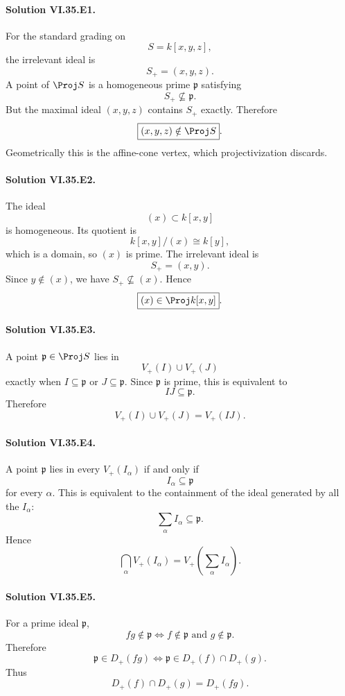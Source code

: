 
\paragraph{Solution VI.35.E1.}
For the standard grading on
\[
S=k[x,y,z],
\]
the irrelevant ideal is
\[
S_+=(x,y,z).
\]
A point of \(\Proj S\) is a homogeneous prime \(\mathfrak p\) satisfying
\[
S_+\not\subseteq\mathfrak p.
\]
But the maximal ideal \((x,y,z)\) contains \(S_+\) exactly. Therefore
\[
\boxed{(x,y,z)\notin\Proj S}.
\]
Geometrically this is the affine-cone vertex, which projectivization discards.

\paragraph{Solution VI.35.E2.}
The ideal
\[
(x)\subset k[x,y]
\]
is homogeneous. Its quotient is
\[
k[x,y]/(x)\cong k[y],
\]
which is a domain, so \((x)\) is prime. The irrelevant ideal is
\[
S_+=(x,y).
\]
Since \(y\notin(x)\), we have \(S_+\not\subseteq(x)\). Hence
\[
\boxed{(x)\in\Proj k[x,y]}.
\]

\paragraph{Solution VI.35.E3.}
A point \(\mathfrak p\in\Proj S\) lies in
\[
V_+(I)\cup V_+(J)
\]
exactly when \(I\subseteq\mathfrak p\) or \(J\subseteq\mathfrak p\). Since \(\mathfrak p\) is prime, this is
equivalent to
\[
IJ\subseteq\mathfrak p.
\]
Therefore
\[
\boxed{V_+(I)\cup V_+(J)=V_+(IJ)}.
\]

\paragraph{Solution VI.35.E4.}
A point \(\mathfrak p\) lies in every \(V_+(I_\alpha)\) if and only if
\[
I_\alpha\subseteq\mathfrak p
\]
for every \(\alpha\). This is equivalent to the containment of the ideal generated by all the \(I_\alpha\):
\[
\sum_\alpha I_\alpha\subseteq\mathfrak p.
\]
Hence
\[
\boxed{
\bigcap_\alpha V_+(I_\alpha)
=
V_+\!\left(\sum_\alpha I_\alpha\right).
}
\]

\paragraph{Solution VI.35.E5.}
For a prime ideal \(\mathfrak p\),
\[
fg\notin\mathfrak p
\iff
f\notin\mathfrak p\text{ and }g\notin\mathfrak p.
\]
Therefore
\[
\mathfrak p\in D_+(fg)
\iff
\mathfrak p\in D_+(f)\cap D_+(g).
\]
Thus
\[
\boxed{D_+(f)\cap D_+(g)=D_+(fg)}.
\]

